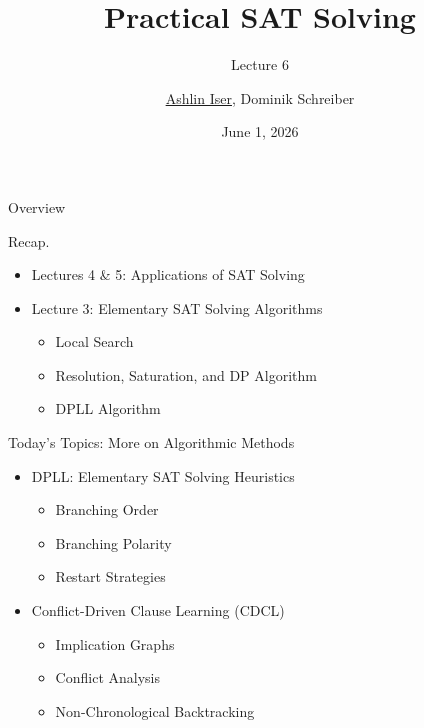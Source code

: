 \documentclass[t]{sdqbeamer}
\title{Practical SAT Solving}
\subtitle{Lecture 6 \unimp{\normalfont -- Elementary SAT Solving Heuristics, Conflict-Driven Clause Learning}}
\author{\underline{Ashlin Iser}, Dominik Schreiber}
\date{June 1, 2026}
\begin{document}
\begin{frame}[title white horizontal, picture=logos/blender-render, kitlogo=rgb]
	\titlepage
\end{frame}

\begin{frame}{Overview}
	\begin{block}{Recap.}
		\begin{itemize}\setlength{\itemsep}{1ex}
			\item Lectures 4 \& 5: Applications of SAT Solving
			\item Lecture 3: Elementary SAT Solving Algorithms
			\begin{itemize}
				\item Local Search
				\item Resolution, Saturation, and DP Algorithm
				\item DPLL Algorithm
			\end{itemize}
		\end{itemize}
	\end{block}
	\pause
	\begin{block}{Today's Topics: More on Algorithmic Methods}
		\begin{itemize}\setlength{\itemsep}{1ex}
			\item DPLL: Elementary SAT Solving Heuristics
			\begin{itemize}
				\item Branching Order
				\item Branching Polarity
				\item Restart Strategies
			\end{itemize}
			\item Conflict-Driven Clause Learning (CDCL)
			\begin{itemize}
				\item Implication Graphs
				\item Conflict Analysis
				\item Non-Chronological Backtracking
			\end{itemize}
		\end{itemize}
	\end{block}
\end{frame}
\end{document}
